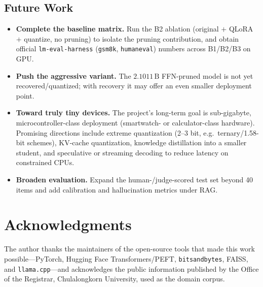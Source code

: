 \documentclass[11pt,a4paper]{article}
\newcommand{\param}[1]{\ensuremath{#1\,\text{B}}}
\begin{document}
\subsection{Future Work}
\begin{itemize}[leftmargin=1.6em]
  \item \textbf{Complete the baseline matrix.} Run the B2 ablation (original
        $+$ QLoRA $+$ quantize, no pruning) to isolate the pruning
        contribution, and obtain official \texttt{lm-eval-harness}
        (\texttt{gsm8k}, \texttt{humaneval}) numbers across B1/B2/B3 on GPU.
  \item \textbf{Push the aggressive variant.} The \param{2.1011} FFN-pruned
        model is not yet recovered/quantized; with recovery it may offer an
        even smaller deployment point.
  \item \textbf{Toward truly tiny devices.} The project's long-term goal is
        sub-gigabyte, microcontroller-class deployment (smartwatch- or
        calculator-class hardware). Promising directions include extreme
        quantization (2--3 bit, e.g.\ ternary/1.58-bit schemes), KV-cache
        quantization, knowledge distillation into a smaller student, and
        speculative or streaming decoding to reduce latency on constrained
        CPUs.
  \item \textbf{Broaden evaluation.} Expand the human-/judge-scored test set
        beyond 40 items and add calibration and hallucination metrics under
        RAG.
\end{itemize}

\section*{Acknowledgments}
The author thanks the maintainers of the open-source tools that made this
work possible---PyTorch, Hugging Face Transformers/PEFT, \texttt{bitsandbytes},
FAISS, and \texttt{llama.cpp}---and acknowledges the public information
published by the Office of the Registrar, Chulalongkorn University, used as
the domain corpus.

\end{document}
